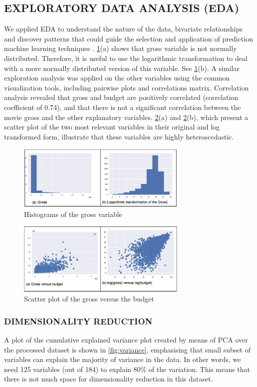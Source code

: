 \subsection{EXPLORATORY DATA ANALYSIS (EDA)}
We applied EDA to understand the nature of the data, bivariate relationships and discover patterns that could guide the selection and application of prediction machine learning techniques \cite{behrens1997principles}. \figurename{} \ref{fig:hist}(a) shows that gross variable is not normally distributed. Therefore, it is useful to use the logarithmic transformation to deal with a more normally distributed version of this variable. See \figurename{} \ref{fig:hist}(b). A similar exploration analysis was applied on the other variables using the common visualization tools, including pairwise plots and correlations matrix. Correlation analysis revealed that gross and budget are positively correlated (correlation coefficient of 0.74), and that there is not a significant correlation between the movie gross and the other explanatory variables. \figurename{} \ref{fig:scatter}(a) and \figurename{} \ref{fig:scatter}(b), which present a scatter plot of the two most relevant variables in their original and log transformed form, illustrate that these variables are highly heteroscedastic. 
\begin{figure}[h]
\centering
\includegraphics[width=3.2in]{figures/hist}
\caption{Histograms of the gross variable} 
\label{fig:hist}
\end{figure}
\begin{figure}[h]
\centering
\includegraphics[width=3.2in]{figures/scatter}
\caption{Scatter plot of the gross versus the budget} 
\label{fig:scatter}
\end{figure}

\subsubsection{DIMENSIONALITY REDUCTION}
A plot of the cumulative explained variance plot created by means of PCA over the processed dataset is shown in \figurename{} \ref{fig:variance}, emphasising that small subset of variables can explain the majority of variance in the data. In other words, we need 125 variables (out of 184) to explain 80\% of the variation. This means that there is not much space for dimensionality reduction in this dataset.

